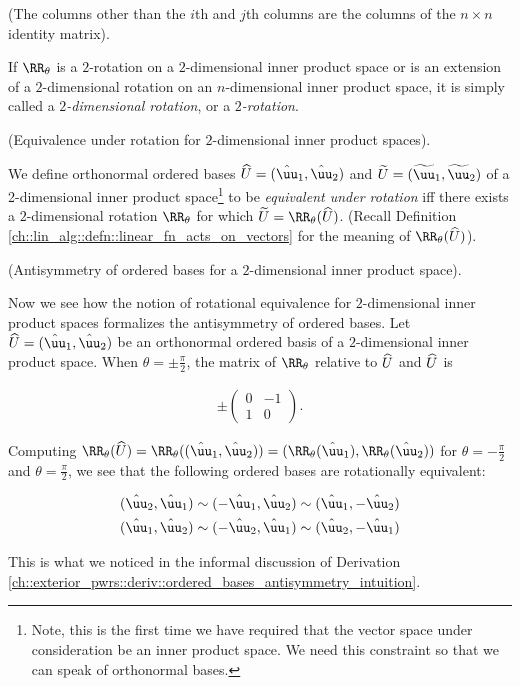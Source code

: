 \begin{defn}
    (The columns other than the $i$th and $j$th columns are the columns of the $n \times n$ identity matrix).
    
    If $\RR_\theta$ is a $2$-rotation on a $2$-dimensional inner product space or is an extension of a $2$-dimensional  rotation on an $n$-dimensional inner product space, it is simply called a \textit{$2$-dimensional  rotation}, or a \textit{$2$-rotation}.
\end{defn}

\begin{defn}
    (Equivalence under rotation for $2$-dimensional inner product spaces).

    We define orthonormal ordered bases $\hU = (\huu_1, \huu_2)$ and $\tU = (\tuu_1, \tuu_2)$ of a 2-dimensional inner product space\footnote{Note, this is the first time we have required that the vector space under consideration be an inner product space. We need this constraint so that we can speak of orthonormal bases.} to be \textit{equivalent under rotation} iff there exists a $2$-dimensional  rotation $\RR_\theta$ for which $\tU = \RR_\theta(\hU)$. (Recall Definition \ref{ch::lin_alg::defn::linear_fn_acts_on_vectors} for the meaning of $\RR_\theta(\hU)$).
\end{defn}

\begin{theorem}
    (Antisymmetry of ordered bases for a $2$-dimensional inner product space).
    
    Now we see how the notion of rotational equivalence for $2$-dimensional inner product spaces formalizes the antisymmetry of ordered bases. Let $\hU = (\huu_1, \huu_2)$ be an orthonormal ordered basis of a $2$-dimensional inner product space. When $\theta = \pm \frac{\pi}{2}$, the matrix of $\RR_\theta$ relative to $\widehat{U}$ and $\widehat{U}$ is
    
    \begin{align*}
        \pm
        \begin{pmatrix}
            0 & -1 \\
            1 & 0
        \end{pmatrix}.
    \end{align*}
    
    Computing $\RR_\theta(\hU) = \RR_\theta((\huu_1, \huu_2)) = (\RR_\theta(\huu_1), \RR_\theta(\huu_2))$ for $\theta = - \frac{\pi}{2}$ and $\theta =\frac{\pi}{2}$, we see that the following ordered bases are rotationally equivalent:
    
    \begin{align*}
        (\huu_2, \huu_1 ) &\sim (-\huu_1, \huu_2) \sim (\huu_1, - \huu_2) \\
        (\huu_1, \huu_2) &\sim (-\huu_2, \huu_1) \sim (\huu_2, -\huu_1)
    \end{align*}

    This is what we noticed in the informal discussion of Derivation \ref{ch::exterior_pwrs::deriv::ordered_bases_antisymmetry_intuition}.
\end{theorem}

